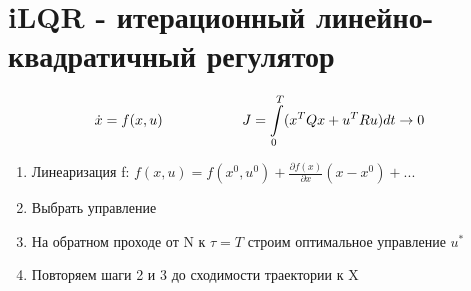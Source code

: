 \documentclass{article}
\begin{document}
\section{iLQR - итерационный линейно-квадратичный регулятор}
\[\dot{x} = f(x, u) \hspace{20mm} J = \int\limits_0^T (x^TQx + u^TRu)dt \to 0\]
\begin{enumerate} 
  \item Линеаризация f:
        $f(x,u) = f(x^0,u^0) + \frac{\partial f(x)}{\partial x}(x-x^0) + ...$
  \item Выбрать управление
  \item На обратном проходе от N к $\tau = T$ строим оптимальное управление $u^*$
  \item Повторяем шаги 2 и 3 до сходимости траектории к X
\end{enumerate}
\end{document}
